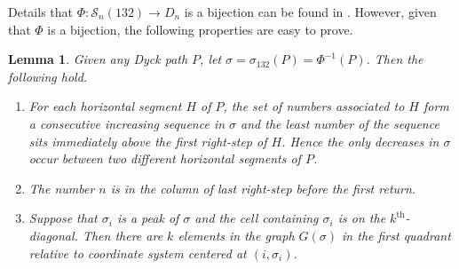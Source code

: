 \documentclass[
final,nomarks
]{dmtcs-episciences}
\newtheorem{lemma}{Lemma}
\newcommand{\Sn}[1]{\mathcal{S}_{#1}}
\begin{document}
Details that  \begin{math}\Phi:\Sn{n}(132) \rightarrow D_n\end{math} is a bijection can be found in \cite{Kr}. 
However, given that \begin{math}\Phi\end{math} is a bijection, the following properties are easy to prove.
\begin{lemma}\label{p1}
	Given any Dyck path \begin{math}P\end{math}, let \begin{math}\sigma=\sigma_{132}(P)=\Phi^{-1}(P)\end{math}. Then the following hold.
	\begin{enumerate}[(1)]
		\item For each horizontal segment \begin{math}H\end{math} of \begin{math}P\end{math}, the set of numbers associated 
		to \begin{math}H\end{math} form a consecutive increasing sequence in \begin{math}\sigma\end{math} and the least 
		number of the sequence sits immediately above the first right-step of \begin{math}H\end{math}. Hence 
		the only decreases in \begin{math}\sigma\end{math} occur between two different horizontal segments of \begin{math}P\end{math}. 
		
		\item The number \begin{math}n\end{math} is in the column of last right-step before the first return. 
		
		
		\item Suppose that \begin{math}\sigma_i\end{math} is a peak of \begin{math}\sigma\end{math} and the cell containing \begin{math}\sigma_i\end{math} is on the 
		\begin{math}k^{\mathrm{th}}\end{math}-diagonal. Then there are \begin{math}k\end{math} elements in the graph 
		\begin{math}G(\sigma)\end{math} in the first quadrant relative 
		to coordinate system centered at \begin{math}(i,\sigma_i)\end{math}. 
	\end{enumerate}
\end{lemma}
\end{document}

